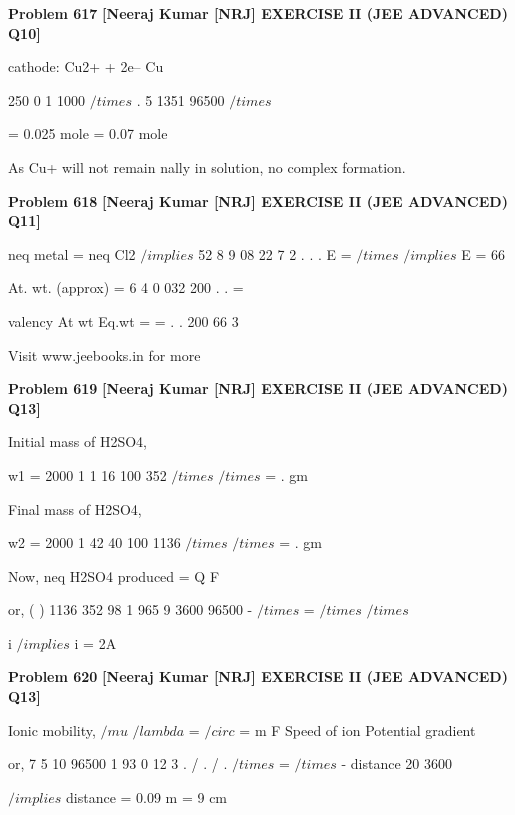 \begin{problembox}
\textbf{Problem 617} \hfill \textbf{[Neeraj Kumar [NRJ] EXERCISE II (JEE ADVANCED) Q10]}
\label{q:ext-nrj_all_questions-617}

cathode:       Cu2+        +      2e-- 
 Cu
 
                 
250
0 1
1000
$/times$ .           5 1351
96500
$/times$
 
                = 0.025 mole      = 0.07 mole
 
 As Cu+ will not remain   nally in solution, no 
complex formation.
\end{problembox}

\begin{problembox}
\textbf{Problem 618} \hfill \textbf{[Neeraj Kumar [NRJ] EXERCISE II (JEE ADVANCED) Q11]}
\label{q:ext-nrj_all_questions-618}

neq metal = neq Cl2 $/implies$ 52 8
9 08
22 7
2
.
.
.
E
=
$/times$
 $/implies$ E = 66
 
 At. wt. (approx) = 6 4
0 032
200
.
.
=
 
   valency
At wt
Eq.wt
=
=
.
.
200
66
3

 
 
Visit www.jeebooks.in for more
\end{problembox}

\begin{problembox}
\textbf{Problem 619} \hfill \textbf{[Neeraj Kumar [NRJ] EXERCISE II (JEE ADVANCED) Q13]}
\label{q:ext-nrj_all_questions-619}

Initial mass of H2SO4, 
 
 w1 = 2000
1 1
16
100
352
$/times$
$/times$
=
.
gm 
 
 Final mass of H2SO4,
 
 w2 = 2000
1 42
40
100
1136
$/times$
$/times$
=
.
gm
 
 Now, neq H2SO4 produced = Q
F
 
 or, (
)
1136
352
98
1
965
9
3600
96500
-
$/times$ =
$/times$
$/times$
 
  
 
  
i
 $/implies$ i = 2A
\end{problembox}

\begin{problembox}
\textbf{Problem 620} \hfill \textbf{[Neeraj Kumar [NRJ] EXERCISE II (JEE ADVANCED) Q13]}
\label{q:ext-nrj_all_questions-620}

Ionic mobility, $/mu$
$/lambda$
=
$/circ$
=
m
F
Speed of ion
Potential gradient
 
 or, 7 5 10
96500
1 93 0 12
3
.
/
.
/ .
$/times$
=
$/times$
-
distance 20
3600 
 
 $/implies$ distance = 0.09 m = 9 cm
\end{problembox}


